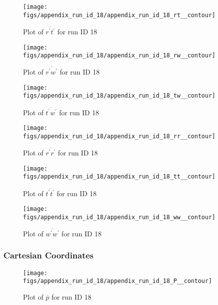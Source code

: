 \begin{figure}[H]
\centering
\texttt{[image: figs/appendix\_run\_id\_18/appendix\_run\_id\_18\_rt\_\_contour]}
\caption{Plot of $\overline{r^\prime t^\prime}$ for run ID 18}
\label{fig:appendix_run_id_18_rt__contour}
\end{figure}


\begin{figure}[H]
\centering
\texttt{[image: figs/appendix\_run\_id\_18/appendix\_run\_id\_18\_rw\_\_contour]}
\caption{Plot of $\overline{r^\prime w^\prime}$ for run ID 18}
\label{fig:appendix_run_id_18_rw__contour}
\end{figure}


\begin{figure}[H]
\centering
\texttt{[image: figs/appendix\_run\_id\_18/appendix\_run\_id\_18\_tw\_\_contour]}
\caption{Plot of $\overline{t^\prime w^\prime}$ for run ID 18}
\label{fig:appendix_run_id_18_tw__contour}
\end{figure}


\begin{figure}[H]
\centering
\texttt{[image: figs/appendix\_run\_id\_18/appendix\_run\_id\_18\_rr\_\_contour]}
\caption{Plot of $\overline{r^\prime r^\prime}$ for run ID 18}
\label{fig:appendix_run_id_18_rr__contour}
\end{figure}


\begin{figure}[H]
\centering
\texttt{[image: figs/appendix\_run\_id\_18/appendix\_run\_id\_18\_tt\_\_contour]}
\caption{Plot of $\overline{t^\prime t^\prime}$ for run ID 18}
\label{fig:appendix_run_id_18_tt__contour}
\end{figure}


\begin{figure}[H]
\centering
\texttt{[image: figs/appendix\_run\_id\_18/appendix\_run\_id\_18\_ww\_\_contour]}
\caption{Plot of $\overline{w^\prime w^\prime}$ for run ID 18}
\label{fig:appendix_run_id_18_ww__contour}
\end{figure}


\subsubsection{Cartesian Coordinates}
\begin{figure}[H]
\centering
\texttt{[image: figs/appendix\_run\_id\_18/appendix\_run\_id\_18\_P\_\_contour]}
\caption{Plot of $\overline{p}$ for run ID 18}
\label{fig:appendix_run_id_18_P__contour}
\end{figure}


